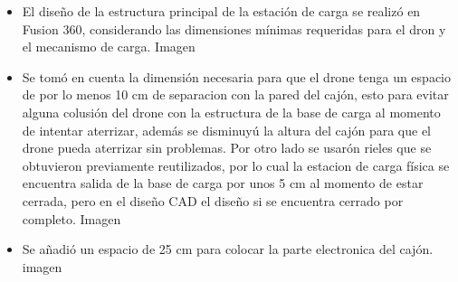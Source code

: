     \begin{itemize}
        \item     El diseño de la estructura principal de la estación de carga se realizó en Fusion 360, considerando las dimensiones mínimas requeridas para el dron y el mecanismo de carga.
        Imagen
        \item     Se tomó en cuenta la dimensión necesaria para que el drone tenga un espacio de por lo menos 10 cm de separacion con la pared del cajón, esto para evitar alguna colusión del drone con la estructura de la base de carga al momento de intentar aterrizar, además se disminuyú la altura del cajón para que el drone pueda aterrizar sin problemas. Por otro lado se usarón rieles que se obtuvieron previamente reutilizados, por lo cual la estacion de carga física se encuentra salida de la base de carga por unos 5 cm al momento de estar cerrada, pero en el diseño CAD el diseño si se encuentra cerrado por completo. 
        Imagen
        \item     Se añadió un espacio de 25 cm para colocar la parte electronica del cajón.
        imagen
    \end{itemize}

